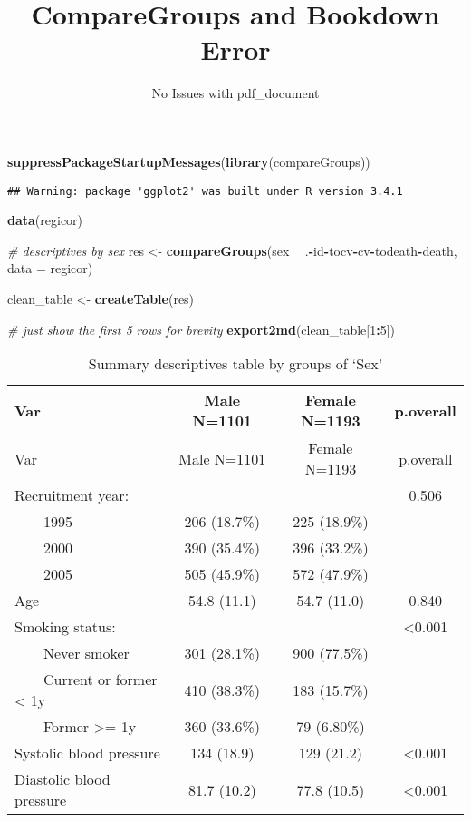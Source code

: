 \documentclass[]{article}
\title{CompareGroups and Bookdown Error}
\subtitle{No Issues with pdf\_document}
\author{}
\date{}
\newenvironment{Shaded}{\begin{snugshade}}{\end{snugshade}}
\newcommand{\KeywordTok}[1]{\textcolor[rgb]{0.13,0.29,0.53}{\textbf{#1}}}
\newcommand{\DataTypeTok}[1]{\textcolor[rgb]{0.13,0.29,0.53}{#1}}
\newcommand{\DecValTok}[1]{\textcolor[rgb]{0.00,0.00,0.81}{#1}}
\newcommand{\StringTok}[1]{\textcolor[rgb]{0.31,0.60,0.02}{#1}}
\newcommand{\CommentTok}[1]{\textcolor[rgb]{0.56,0.35,0.01}{\textit{#1}}}
\newcommand{\OperatorTok}[1]{\textcolor[rgb]{0.81,0.36,0.00}{\textbf{#1}}}
\newcommand{\NormalTok}[1]{#1}
\begin{document}
\maketitle

\begin{Shaded}
\begin{Highlighting}[]
\KeywordTok{suppressPackageStartupMessages}\NormalTok{(}\KeywordTok{library}\NormalTok{(compareGroups))}
\end{Highlighting}
\end{Shaded}

\begin{verbatim}
## Warning: package 'ggplot2' was built under R version 3.4.1
\end{verbatim}

\begin{Shaded}
\begin{Highlighting}[]
\KeywordTok{data}\NormalTok{(regicor)}

\CommentTok{# descriptives by sex}
\NormalTok{res <-}\StringTok{ }\KeywordTok{compareGroups}\NormalTok{(sex }\OperatorTok{~}\StringTok{ }\NormalTok{.}\OperatorTok{-}\NormalTok{id}\OperatorTok{-}\NormalTok{tocv}\OperatorTok{-}\NormalTok{cv}\OperatorTok{-}\NormalTok{todeath}\OperatorTok{-}\NormalTok{death, }\DataTypeTok{data =}\NormalTok{ regicor)}

\NormalTok{clean_table <-}\StringTok{ }\KeywordTok{createTable}\NormalTok{(res)}
\end{Highlighting}
\end{Shaded}

\begin{Shaded}
\begin{Highlighting}[]
\CommentTok{# just show the first 5 rows for brevity}
\KeywordTok{export2md}\NormalTok{(clean_table[}\DecValTok{1}\OperatorTok{:}\DecValTok{5}\NormalTok{])}
\end{Highlighting}
\end{Shaded}

\begin{longtable}[]{@{}lccc@{}}
\caption{Summary descriptives table by groups of `Sex'}\tabularnewline
\toprule
Var & Male N=1101 & Female N=1193 & p.overall\tabularnewline
\midrule
\endfirsthead
\toprule
Var & Male N=1101 & Female N=1193 & p.overall\tabularnewline
\midrule
\endhead
Recruitment year: & & & 0.506\tabularnewline
~~~~1995 & 206 (18.7\%) & 225 (18.9\%) &\tabularnewline
~~~~2000 & 390 (35.4\%) & 396 (33.2\%) &\tabularnewline
~~~~2005 & 505 (45.9\%) & 572 (47.9\%) &\tabularnewline
Age & 54.8 (11.1) & 54.7 (11.0) & 0.840\tabularnewline
Smoking status: & & & \textless{}0.001\tabularnewline
~~~~Never smoker & 301 (28.1\%) & 900 (77.5\%) &\tabularnewline
~~~~Current or former \textless{} 1y & 410 (38.3\%) & 183 (15.7\%)
&\tabularnewline
~~~~Former \textgreater{}= 1y & 360 (33.6\%) & 79 (6.80\%)
&\tabularnewline
Systolic blood pressure & 134 (18.9) & 129 (21.2) &
\textless{}0.001\tabularnewline
Diastolic blood pressure & 81.7 (10.2) & 77.8 (10.5) &
\textless{}0.001\tabularnewline
\bottomrule
\end{longtable}
\end{document}
